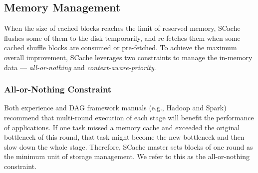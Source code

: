 \subsection{Memory Management}\label{memorymanage}
When the size of cached blocks reaches the limit of reserved memory, SCache flushes some of them to the disk temporarily, and re-fetches them when some cached shuffle blocks are consumed or pre-fetched. 
To achieve the maximum overall improvement, SCache leverages two constraints to manage the in-memory data --- \textit{all-or-nothing} and \textit{context-aware-priority}.

\subsubsection{All-or-Nothing Constraint}
{\color{black}
Both experience and DAG framework manuals (e.g., Hadoop and Spark) recommend that multi-round execution of each stage will benefit the performance of applications.
If one task missed a memory cache and exceeded the original bottleneck of this round, that task might become the new bottleneck and then slow down the whole stage. 
Therefore, SCache master sets blocks of one round as the minimum unit of storage management.
We refer to this as the all-or-nothing constraint.
}

